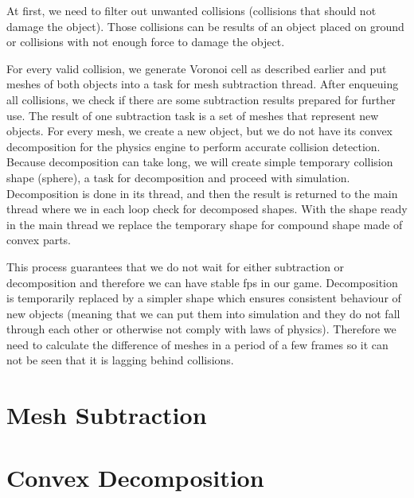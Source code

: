 At first, we need to filter out unwanted collisions (collisions that should not damage the object). Those collisions can be results of an object placed on ground or collisions with not enough force to damage the object. 

For every valid collision, we generate Voronoi cell as described earlier and put meshes of both objects into a task for mesh subtraction thread. After enqueuing all collisions, we check if there are some subtraction results prepared for further use. The result of one subtraction task is a set of meshes that represent new objects. For every mesh, we create a new object, but we do not have its convex decomposition for the physics engine to perform accurate collision detection. Because decomposition can take long, we will create simple temporary collision shape (\eg sphere), a task for decomposition and proceed with simulation. Decomposition is done in its thread, and then the result is returned to the main thread where we in each loop check for decomposed shapes. With the shape ready in the main thread we replace the temporary shape for compound shape made of convex parts.

This process guarantees that we do not wait for either subtraction or decomposition and therefore we can have stable fps in our game. Decomposition is temporarily replaced by a simpler shape which ensures consistent behaviour of new objects (meaning that we can put them into simulation and they do not fall through each other or otherwise not comply with laws of physics). Therefore we need to calculate the difference of meshes in a period of a few frames so it can not be seen that it is lagging behind collisions.


\section{Mesh Subtraction}
\label{sec:subtraction}

\section{Convex Decomposition}
\label{sec:decomposition}



